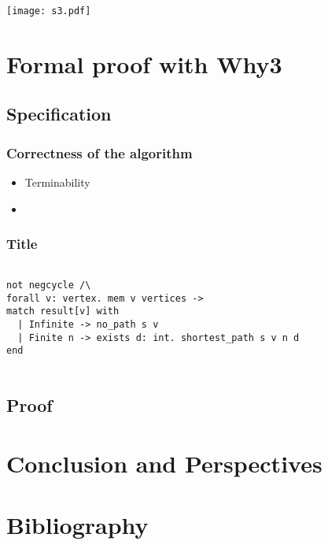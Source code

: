 \documentclass{beamer}
\begin{document}
\begin{frame}\frametitle{}

\begin{center} \texttt{[image: s3.pdf]} \end{center}

\end{frame}

\section{Formal proof with Why3}

\subsection{Specification}

\begin{frame}\frametitle{Correctness of the algorithm}

\begin{itemize}
\item Terminability
\item 
\end{itemize}

\end{frame}


\begin{frame}[fragile]\frametitle{Title}

\begin{lstlisting}[language=why3]

not negcycle /\
forall v: vertex. mem v vertices ->
match result[v] with
  | Infinite -> no_path s v
  | Finite n -> exists d: int. shortest_path s v n d
end


\end{lstlisting}

\end{frame}

\subsection{Proof}


\begin{frame}\frametitle{}
\end{frame}


\section{Conclusion and Perspectives}






\section{Bibliography}
\begin{frame}




\end{frame}
\end{document}
